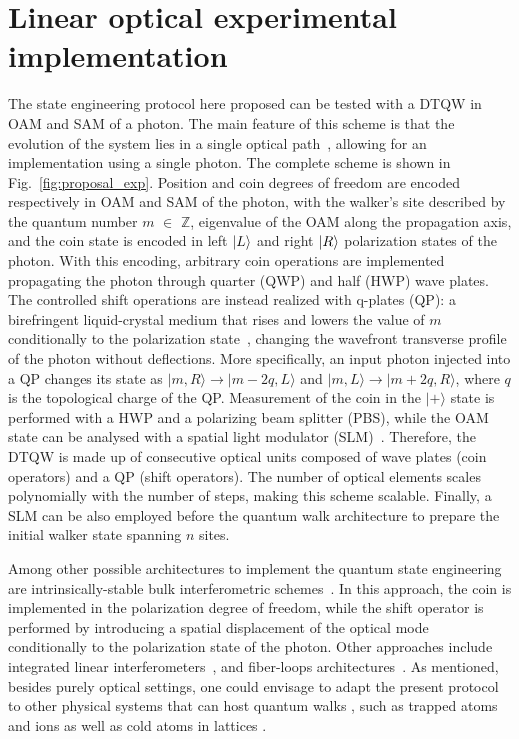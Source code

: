\section{Linear optical experimental implementation} The state engineering protocol here proposed can be tested with a DTQW in \ac{OAM} and \ac{SAM} of a photon.
The main feature of this scheme is that the evolution of the system lies in a single optical path~\cite{zhang2010implementation}, allowing for an implementation using a single photon.
The complete scheme is shown in Fig.~\ref{fig:proposal_exp}.
Position and coin degrees of freedom are encoded respectively in \ac{OAM} and \ac{SAM} of the photon,
with the walker's site described by the quantum number $m$ $\in$ $\mathbb{Z}$, eigenvalue of the \ac{OAM} along the propagation axis, and the coin state is encoded in left $\ket L$ and right $\ket R$ polarization states of the photon.
With this encoding, arbitrary coin operations are implemented propagating the photon through quarter (QWP) and half (HWP) wave plates.
The controlled shift operations are instead realized with q-plates (QP):
a birefringent liquid-crystal medium that rises and lowers the value of $m$ conditionally to the polarization state~\cite{marrucci2006optical},
changing the wavefront transverse profile of the photon without deflections.
More specifically, an input photon injected into a QP changes its state as $\vert m,R \rangle \rightarrow \vert m-2q,L \rangle$ and $\vert m,L \rangle \rightarrow \vert m+2q,R \rangle$, where $q$ is the topological charge of the QP.
Measurement of the coin in the $\vert + \rangle$ state is performed with a HWP and a polarizing beam splitter (PBS),
while the OAM state can be analysed with a spatial light modulator (SLM)~\cite{cardano2015quantum}.
Therefore, the DTQW is made up of consecutive optical units composed of wave plates (coin operators) and a QP (shift operators).
The number of optical elements scales polynomially with the number of steps, making this scheme scalable.
Finally, a SLM can be also employed before the quantum walk architecture to prepare the initial walker state spanning $n$ sites.

Among other possible architectures to implement the quantum state engineering are intrinsically-stable bulk interferometric schemes~\cite{broome2010discrete,kitagawa2012observation,vitelli2013joining}.
In this approach, the coin is implemented in the polarization degree of freedom,
while the shift operator is performed by introducing a spatial displacement of the optical mode conditionally to the polarization state of the photon.
Other approaches include integrated linear interferometers~\cite{sansoni2012twoparticle, crespi2013anderson, harris2015bosonic, pitsios2016photonic}, and fiber-loops architectures~\cite{schreiber2010photons, schreiber2012a, boutari2016large}. As mentioned, besides purely optical settings, one could envisage to adapt the present protocol to other physical systems that can host quantum walks \cite{manouchehri2014physical}, such as trapped atoms \cite{karski2009quantum} and ions \cite{schmitz2009quantum, zhringer2010realization} as well as cold atoms in lattices \cite{weitenberg2011singlespin, fukuhara2013microscopic, preiss2015strongly}.

